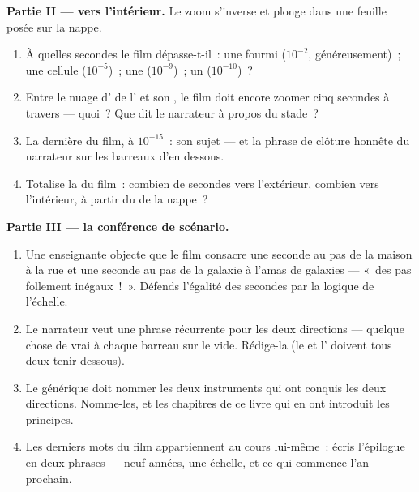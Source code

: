 \begin{problem}
\medskip\noindent\textbf{Partie II --- vers l'intérieur.}
Le zoom s'inverse et plonge dans une feuille posée sur la nappe.
\begin{enumerate}[resume]
  \item À quelles secondes le film dépasse-t-il~: une fourmi
        ($10^{-2}$, généreusement)~; une cellule ($10^{-5}$)~; une
         ($10^{-9}$)~; un  ($10^{-10}$)~?
  \item Entre le nuage d' de l' et son , le film
        doit encore zoomer cinq secondes à travers --- quoi~? Que
        dit le narrateur à propos du stade~?
  \item La dernière  du film, à $10^{-15}$~: son sujet --- et
        la phrase de clôture honnête du narrateur sur les barreaux
        d'en dessous.
  \item Totalise la  du film~: combien de secondes vers
        l'extérieur, combien vers l'intérieur, à partir du  de
        la nappe~?
\end{enumerate}

\medskip\noindent\textbf{Partie III --- la conférence de scénario.}
\begin{enumerate}[resume]
  \item Une enseignante objecte que le film consacre une seconde au
        pas de la maison à la rue et une seconde au pas de la
        galaxie à l'amas de galaxies --- «~des pas follement
        inégaux~!~». Défends l'égalité des secondes par la logique
        de l'échelle.
  \item Le narrateur veut une phrase récurrente pour les deux
        directions --- quelque chose de vrai à chaque barreau sur
        le vide. Rédige-la (le  et l' doivent
        tous deux tenir dessous).
  \item Le générique doit nommer les deux instruments qui ont
        conquis les deux directions. Nomme-les, et les chapitres de
        ce livre qui en ont introduit les principes.
  \item Les derniers mots du film appartiennent au cours
        lui-même~: écris l'épilogue en deux phrases --- neuf
        années, une échelle, et ce qui commence l'an prochain.
\end{enumerate}
\end{problem}
